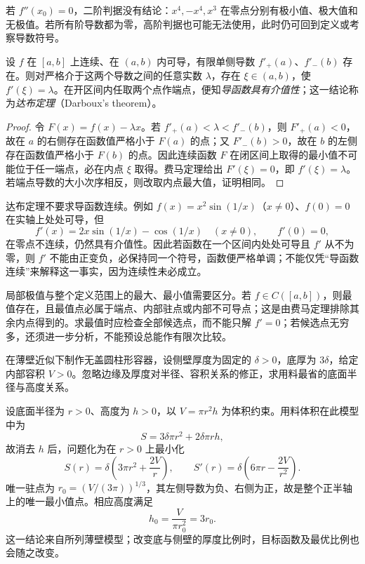 \documentclass[UTF8,12pt,a4paper,fontset=fandol]{ctexbook}
\begin{document}
若 $f''(x_0)=0$，二阶判据没有结论：$x^4,-x^4,x^3$ 在零点分别有极小值、极大值和无极值。若所有阶导数都为零，高阶判据也可能无法使用，此时仍可回到定义或考察导数符号。

\begin{theorem}[达布定理]
\label{thm:darboux-derivative-intermediate-value}
设 $f$ 在 $[a,b]$ 上连续、在 $(a,b)$ 内可导，有限单侧导数 $f'_+(a)$、$f'_-(b)$ 存在。则对严格介于这两个导数之间的任意实数 $\lambda$，存在 $\xi\in(a,b)$，使 $f'(\xi)=\lambda$。在开区间内任取两个点作端点，便知\emph{导函数具有介值性}；这一结论称为\emph{达布定理}（Darboux's theorem）。
\end{theorem}

\begin{proof}
令 $F(x)=f(x)-\lambda x$。若 $f'_+(a)<\lambda<f'_-(b)$，则 $F'_+(a)<0$，故在 $a$ 的右侧存在函数值严格小于 $F(a)$ 的点；又 $F'_-(b)>0$，故在 $b$ 的左侧存在函数值严格小于 $F(b)$ 的点。因此连续函数 $F$ 在闭区间上取得的最小值不可能位于任一端点，必在内点 $\xi$ 取得。费马定理给出 $F'(\xi)=0$，即 $f'(\xi)=\lambda$。若端点导数的大小次序相反，则改取内点最大值，证明相同。
\end{proof}

达布定理不要求导函数连续。例如 $f(x)=x^2\sin(1/x)$（$x\neq0$）、$f(0)=0$ 在实轴上处处可导，但
\[
    f'(x)=2x\sin(1/x)-\cos(1/x)\quad(x\neq0),\qquad f'(0)=0,
\]
在零点不连续，仍然具有介值性。因此若函数在一个区间内处处可导且 $f'$ 从不为零，则 $f'$ 不能由正变负，必保持同一个符号，函数便严格单调；不能仅凭“导函数连续”来解释这一事实，因为连续性未必成立。

局部极值与整个定义范围上的最大、最小值需要区分。若 $f\in C([a,b])$，则最值存在，且最值点必属于端点、内部驻点或内部不可导点；这是由费马定理排除其余内点得到的。求最值时应检查全部候选点，而不能只解 $f'=0$；若候选点无穷多，还须进一步分析，不能预设总能作有限次比较。

\begin{example}
\label{ex:weighted-cylinder-material-minimization}
在薄壁近似下制作无盖圆柱形容器，设侧壁厚度为固定的 $\delta>0$，底厚为 $3\delta$，给定内部容积 $V>0$。忽略边缘及厚度对半径、容积关系的修正，求用料最省的底面半径与高度关系。
\end{example}

\begin{solve}
设底面半径为 $r>0$、高度为 $h>0$，以 $V=\pi r^2h$ 为体积约束。用料体积在此模型中为
\[
    S=3\delta\pi r^2+2\delta\pi rh,
\]
故消去 $h$ 后，问题化为在 $r>0$ 上最小化
\[
    S(r)=\delta\left(3\pi r^2+\frac{2V}{r}\right),\qquad
    S'(r)=\delta\left(6\pi r-\frac{2V}{r^2}\right).
\]
唯一驻点为 $r_0=(V/(3\pi))^{1/3}$，其左侧导数为负、右侧为正，故是整个正半轴上的唯一最小值点。相应高度满足
\[
    h_0=\frac{V}{\pi r_0^2}=3r_0.
\]
这一结论来自所列薄壁模型；改变底与侧壁的厚度比例时，目标函数及最优比例也会随之改变。
\end{solve}
\end{document}
